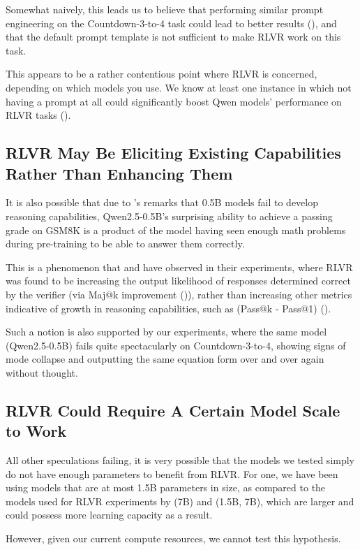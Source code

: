 \documentclass{article} %
\theoremstyle{definition}
\begin{document}
Somewhat naively, this leads us to believe that performing similar prompt engineering
on the Countdown-3-to-4 task could lead to better results (\cite{Chen-2025}), and that the default prompt template
is not sufficient to make RLVR work on this task.

This appears to be a rather contentious point where RLVR is concerned, 
depending on which models you use. We know at least one instance in which
not having a prompt at all could significantly boost Qwen models' performance on 
RLVR tasks (\cite{Liu-et-al-2025}).

\subsection{RLVR May Be Eliciting Existing Capabilities Rather Than Enhancing Them}
It is also possible that due to \cite{tinyzero}'s remarks that 0.5B models fail to develop reasoning capabilities,
Qwen2.5-0.5B's surprising ability to achieve a passing grade on GSM8K is a product of the model having
seen enough math problems during pre-training to be able to answer them correctly.

This is a phenomenon that \cite{grpo} and \cite{Yue-et-al-2025} have observed in their experiments,
where RLVR was found to be increasing the output likelihood of responses determined correct
by the verifier (via Maj@k improvement (\cite{grpo})), rather than increasing other metrics indicative of growth in 
reasoning capabilities, such as (Pass@k - Pass@1) (\cite{Yue-et-al-2025}).

Such a notion is also supported by our experiments, where the same model (Qwen2.5-0.5B)
fails quite spectacularly on Countdown-3-to-4, showing signs of mode collapse 
and outputting the same equation form over and over again without thought.

\subsection{RLVR Could Require A Certain Model Scale to Work}
All other speculations failing, it is very possible that the models we tested
simply do not have enough parameters to benefit from RLVR.
For one, we have been using models that are at most 1.5B parameters in size,
as compared to the models used for RLVR experiments by \cite{grpo} (7B) and \cite{Liu-et-al-2025} (1.5B, 7B),
which are larger and could possess more learning capacity as a result.

However, given our current compute resources, we cannot test this hypothesis.
\end{document}
